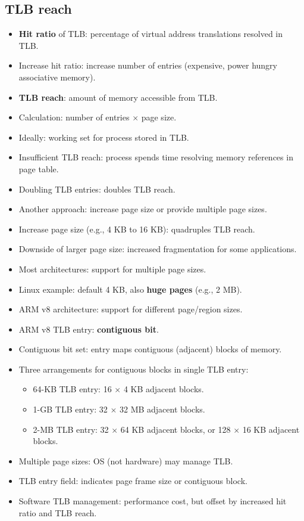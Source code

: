 \subsection{TLB reach}
\begin{itemize}
    \item \textbf{Hit ratio} of TLB: percentage of virtual address translations resolved in TLB.
    \item Increase hit ratio: increase number of entries (expensive, power hungry associative memory).
    \item \textbf{TLB reach}: amount of memory accessible from TLB.
    \item Calculation: number of entries $\times$ page size.
    \item Ideally: working set for process stored in TLB.
    \item Insufficient TLB reach: process spends time resolving memory references in page table.
    \item Doubling TLB entries: doubles TLB reach.
    \item Another approach: increase page size or provide multiple page sizes.
    \item Increase page size (e.g., 4 KB to 16 KB): quadruples TLB reach.
    \item Downside of larger page size: increased fragmentation for some applications.
    \item Most architectures: support for multiple page sizes.
    \item Linux example: default 4 KB, also \textbf{huge pages} (e.g., 2 MB).
    \item ARM v8 architecture: support for different page/region sizes.
    \item ARM v8 TLB entry: \textbf{contiguous bit}.
    \item Contiguous bit set: entry maps contiguous (adjacent) blocks of memory.
    \item Three arrangements for contiguous blocks in single TLB entry:
    \begin{itemize}
        \item 64-KB TLB entry: 16 $\times$ 4 KB adjacent blocks.
        \item 1-GB TLB entry: 32 $\times$ 32 MB adjacent blocks.
        \item 2-MB TLB entry: 32 $\times$ 64 KB adjacent blocks, or 128 $\times$ 16 KB adjacent blocks.
    \end{itemize}
    \item Multiple page sizes: OS (not hardware) may manage TLB.
    \item TLB entry field: indicates page frame size or contiguous block.
    \item Software TLB management: performance cost, but offset by increased hit ratio and TLB reach.
\end{itemize}

